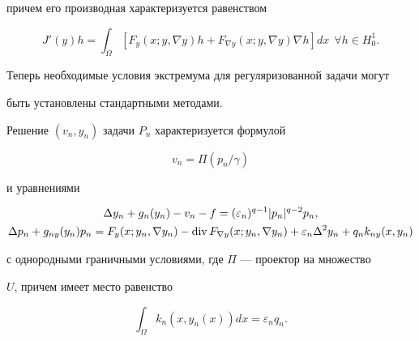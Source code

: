 причем его производная характеризуется равенством 


$$ 


J'(y)h=\int_\Omega[F_y(x;y,\nabla y)h+F_{\nabla y} 


(x;y,\nabla y)\nabla h]dx\ \ \forall h\in H^1_0. 


$$ 


Теперь необходимые условия экстремума для регуляризованной задачи могут 


быть установлены стандартными методами. 


 


\begin{thm} 


Решение $(v_n,y_n)$ задачи $P_n$ характеризуется формулой 


\begin{equation} 


v_n=\Pi(p_n/\gamma) 


\end{equation} 


и уравнениями 


\begin{gather} 


\Delta y_n+g_n(y_n)-v_n-f=(\varepsilon_n)^{q-1} 


|p_n|^{q-2}p_n,\\ 


% 


\Delta p_n+g_{ny}(y_n)p_n=F_y(x;y_n,\nabla y_n)- 


\Div F_{\nabla y} (x;y_n,\nabla y_n)+\varepsilon_n 


\Delta^2y_n+q_n k_{ny}(x,y_n) 


\end{gather} 


с однородными граничными условиями, где $\Pi$ --- проектор на множество 


$U$, причем имеет место равенство 


\begin{equation} 


\int_\Omega k_n(x,y_n(x))dx=\varepsilon_n q_n. 


\end{equation} 


\end{thm} 


 



